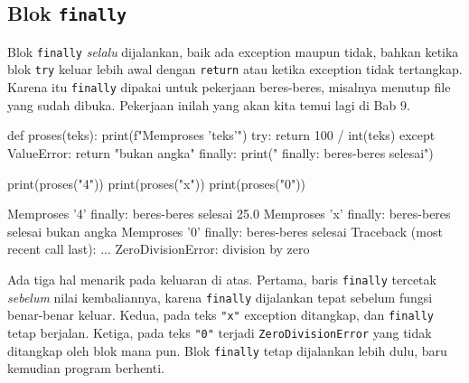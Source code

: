 \subsection{Blok \texttt{finally}}

Blok \texttt{finally} \emph{selalu} dijalankan, baik ada exception maupun tidak, bahkan ketika blok \texttt{try} keluar lebih awal dengan \texttt{return} atau ketika exception tidak tertangkap. Karena itu \texttt{finally} dipakai untuk pekerjaan beres-beres, misalnya menutup file yang sudah dibuka. Pekerjaan inilah yang akan kita temui lagi di Bab 9.

\begin{kode}
def proses(teks):
    print(f"Memproses '{teks}'")
    try:
        return 100 / int(teks)
    except ValueError:
        return "bukan angka"
    finally:
        print("  finally: beres-beres selesai")

print(proses("4"))
print(proses("x"))
print(proses("0"))
\end{kode}

\begin{keluaran}
Memproses '4'
  finally: beres-beres selesai
25.0
Memproses 'x'
  finally: beres-beres selesai
bukan angka
Memproses '0'
  finally: beres-beres selesai
Traceback (most recent call last):
  ...
ZeroDivisionError: division by zero
\end{keluaran}

Ada tiga hal menarik pada keluaran di atas. Pertama, baris \texttt{finally} tercetak \emph{sebelum} nilai kembaliannya, karena \texttt{finally} dijalankan tepat sebelum fungsi benar-benar keluar. Kedua, pada teks \texttt{"x"} exception ditangkap, dan \texttt{finally} tetap berjalan. Ketiga, pada teks \texttt{"0"} terjadi \texttt{ZeroDivisionError} yang tidak ditangkap oleh blok mana pun. Blok \texttt{finally} tetap dijalankan lebih dulu, baru kemudian program berhenti.

